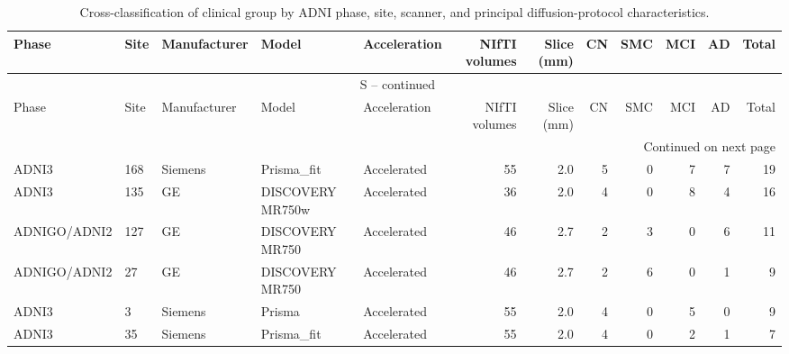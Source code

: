 \documentclass{article}
\renewcommand{\thetable}{S\arabic{table}}
\providecommand{\DIFaddtex}[1]{{\protect\color{blue}#1}} %
\providecommand{\DIFadd}[1]{\texorpdfstring{\DIFaddtex{#1}}{#1}} %
\begin{document}
\begin{landscape}
\scriptsize
\setlength{\tabcolsep}{2.5pt}
\begin{longtable}{lllllrrrrrrr}
\caption{\DIFadd{Cross-classification of clinical group by ADNI phase, site, scanner, and principal diffusion-protocol characteristics.}}\label{tab:acquisition_cells} \\
\toprule
\DIFadd{Phase }& \DIFadd{Site }& \DIFadd{Manufacturer }& \DIFadd{Model }& \DIFadd{Acceleration }& \DIFadd{NIfTI volumes }& \DIFadd{Slice (mm) }& \DIFadd{CN }& \DIFadd{SMC }& \DIFadd{MCI }& \DIFadd{AD }& \DIFadd{Total }\\
\midrule
\endfirsthead
\multicolumn{12}{c}{\tablename\DIFadd{\ \thetable{} -- continued}} \\
\toprule
\DIFadd{Phase }& \DIFadd{Site }& \DIFadd{Manufacturer }& \DIFadd{Model }& \DIFadd{Acceleration }& \DIFadd{NIfTI volumes }& \DIFadd{Slice (mm) }& \DIFadd{CN }& \DIFadd{SMC }& \DIFadd{MCI }& \DIFadd{AD }& \DIFadd{Total }\\
\midrule
\endhead
\midrule
\multicolumn{12}{r}{\DIFadd{Continued on next page}} \\
\endfoot
\bottomrule
\endlastfoot
\DIFadd{ADNI3 }& \DIFadd{168 }& \DIFadd{Siemens }& \DIFadd{Prisma\_fit }& \DIFadd{Accelerated }& \DIFadd{55 }& \DIFadd{2.0 }& \DIFadd{5 }& \DIFadd{0 }& \DIFadd{7 }& \DIFadd{7 }& \DIFadd{19 }\\
\DIFadd{ADNI3 }& \DIFadd{135 }& \DIFadd{GE }& \DIFadd{DISCOVERY MR750w }& \DIFadd{Accelerated }& \DIFadd{36 }& \DIFadd{2.0 }& \DIFadd{4 }& \DIFadd{0 }& \DIFadd{8 }& \DIFadd{4 }& \DIFadd{16 }\\
\DIFadd{ADNIGO/ADNI2 }& \DIFadd{127 }& \DIFadd{GE }& \DIFadd{DISCOVERY MR750 }& \DIFadd{Accelerated }& \DIFadd{46 }& \DIFadd{2.7 }& \DIFadd{2 }& \DIFadd{3 }& \DIFadd{0 }& \DIFadd{6 }& \DIFadd{11 }\\
\DIFadd{ADNIGO/ADNI2 }& \DIFadd{27 }& \DIFadd{GE }& \DIFadd{DISCOVERY MR750 }& \DIFadd{Accelerated }& \DIFadd{46 }& \DIFadd{2.7 }& \DIFadd{2 }& \DIFadd{6 }& \DIFadd{0 }& \DIFadd{1 }& \DIFadd{9 }\\
\DIFadd{ADNI3 }& \DIFadd{3 }& \DIFadd{Siemens }& \DIFadd{Prisma }& \DIFadd{Accelerated }& \DIFadd{55 }& \DIFadd{2.0 }& \DIFadd{4 }& \DIFadd{0 }& \DIFadd{5 }& \DIFadd{0 }& \DIFadd{9 }\\
\DIFadd{ADNI3 }& \DIFadd{35 }& \DIFadd{Siemens }& \DIFadd{Prisma\_fit }& \DIFadd{Accelerated }& \DIFadd{55 }& \DIFadd{2.0 }& \DIFadd{4 }& \DIFadd{0 }& \DIFadd{2 }& \DIFadd{1 }& \DIFadd{7 }\\

\end{longtable}
\end{landscape}
\end{document}
